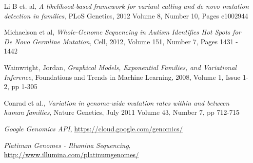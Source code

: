 \documentclass{article}
\begin{document}
\begin{thebibliography}{10}

   Li B et. al,
   \emph{A likelihood-based framework for variant calling and de novo mutation detection in families},
   PLoS Genetics, 2012
   Volume 8, Number 10, Pages e1002944

   Michaelson et al,
   \emph{Whole-Genome Sequencing in Autism Identifies Hot Spots for De Novo Germline Mutation},
   Cell, 2012,
   Volume 151, Number 7, Pages 1431 - 1442

	Wainwright, Jordan,
	\emph{Graphical Models, Exponential Families, and Variational Inference},
	Foundations and Trends in Machine Learning, 2008,
	Volume 1, Issue 1-2, pp 1-305

	Conrad et al.,
	\emph{Variation in genome-wide mutation rates within and between human families},
	Nature Genetics, July 2011
	Volume 43, Number 7, pp 712-715

	\emph{Google Genomics API},
	\url{https://cloud.google.com/genomics/}

	\emph{Platinum Genomes - Illumina Sequencing},
	\url{http://www.illumina.com/platinumgenomes/}

\end{thebibliography}
\end{document}
